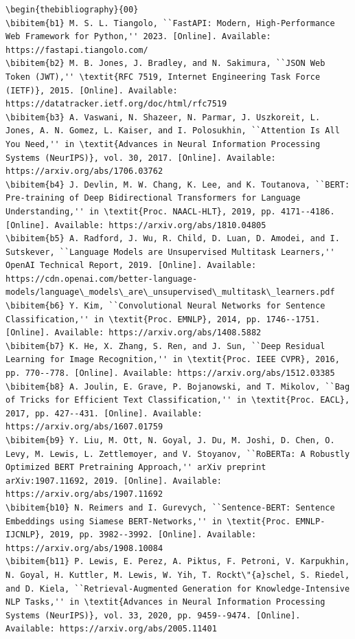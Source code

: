 \documentclass[conference]{IEEEtran}
\begin{document}
\begin{lstlisting}
\begin{thebibliography}{00}
\bibitem{b1} M. S. L. Tiangolo, ``FastAPI: Modern, High-Performance Web Framework for Python,'' 2023. [Online]. Available: https://fastapi.tiangolo.com/
\bibitem{b2} M. B. Jones, J. Bradley, and N. Sakimura, ``JSON Web Token (JWT),'' \textit{RFC 7519, Internet Engineering Task Force (IETF)}, 2015. [Online]. Available: https://datatracker.ietf.org/doc/html/rfc7519
\bibitem{b3} A. Vaswani, N. Shazeer, N. Parmar, J. Uszkoreit, L. Jones, A. N. Gomez, L. Kaiser, and I. Polosukhin, ``Attention Is All You Need,'' in \textit{Advances in Neural Information Processing Systems (NeurIPS)}, vol. 30, 2017. [Online]. Available: https://arxiv.org/abs/1706.03762
\bibitem{b4} J. Devlin, M. W. Chang, K. Lee, and K. Toutanova, ``BERT: Pre-training of Deep Bidirectional Transformers for Language Understanding,'' in \textit{Proc. NAACL-HLT}, 2019, pp. 4171--4186. [Online]. Available: https://arxiv.org/abs/1810.04805
\bibitem{b5} A. Radford, J. Wu, R. Child, D. Luan, D. Amodei, and I. Sutskever, ``Language Models are Unsupervised Multitask Learners,'' OpenAI Technical Report, 2019. [Online]. Available: https://cdn.openai.com/better-language-models/language\_models\_are\_unsupervised\_multitask\_learners.pdf
\bibitem{b6} Y. Kim, ``Convolutional Neural Networks for Sentence Classification,'' in \textit{Proc. EMNLP}, 2014, pp. 1746--1751. [Online]. Available: https://arxiv.org/abs/1408.5882
\bibitem{b7} K. He, X. Zhang, S. Ren, and J. Sun, ``Deep Residual Learning for Image Recognition,'' in \textit{Proc. IEEE CVPR}, 2016, pp. 770--778. [Online]. Available: https://arxiv.org/abs/1512.03385
\bibitem{b8} A. Joulin, E. Grave, P. Bojanowski, and T. Mikolov, ``Bag of Tricks for Efficient Text Classification,'' in \textit{Proc. EACL}, 2017, pp. 427--431. [Online]. Available: https://arxiv.org/abs/1607.01759
\bibitem{b9} Y. Liu, M. Ott, N. Goyal, J. Du, M. Joshi, D. Chen, O. Levy, M. Lewis, L. Zettlemoyer, and V. Stoyanov, ``RoBERTa: A Robustly Optimized BERT Pretraining Approach,'' arXiv preprint arXiv:1907.11692, 2019. [Online]. Available: https://arxiv.org/abs/1907.11692
\bibitem{b10} N. Reimers and I. Gurevych, ``Sentence-BERT: Sentence Embeddings using Siamese BERT-Networks,'' in \textit{Proc. EMNLP-IJCNLP}, 2019, pp. 3982--3992. [Online]. Available: https://arxiv.org/abs/1908.10084
\bibitem{b11} P. Lewis, E. Perez, A. Piktus, F. Petroni, V. Karpukhin, N. Goyal, H. Kuttler, M. Lewis, W. Yih, T. Rockt\"{a}schel, S. Riedel, and D. Kiela, ``Retrieval-Augmented Generation for Knowledge-Intensive NLP Tasks,'' in \textit{Advances in Neural Information Processing Systems (NeurIPS)}, vol. 33, 2020, pp. 9459--9474. [Online]. Available: https://arxiv.org/abs/2005.11401

\end{lstlisting}
\end{document}
